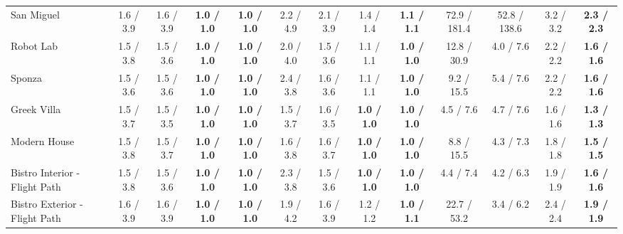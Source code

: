 \begin{table*}[t]
\begin{tabular}{l cccc|cccc|cccc}
	San Miguel                    & 1.6 / 3.9            & 1.6 / 3.9            & \textbf{1.0 / 1.0}          & \textbf{1.0 / 1.0}          & 2.2 / 4.9            & 2.1 / 3.9            & 1.4 / 1.4            & \textbf{1.1 / 1.1}          & 72.9 / 181.4          & 52.8 / 138.6         & 3.2 / 3.2            & \textbf{2.3 / 2.3}          \\
	Robot Lab                     & 1.5 / 3.8            & 1.5 / 3.6            & \textbf{1.0 / 1.0}          & \textbf{1.0 / 1.0}          & 2.0 / 4.0            & 1.5 / 3.6            & 1.1 / 1.1            & \textbf{1.0 / 1.0}          & 12.8 / 30.9           & 4.0 / 7.6            & 2.2 / 2.2            & \textbf{1.6 / 1.6}          \\
	Sponza                        & 1.5 / 3.6            & 1.5 / 3.6            & \textbf{1.0 / 1.0}          & \textbf{1.0 / 1.0}          & 2.4 / 3.8            & 1.6 / 3.6            & 1.1 / 1.1            & \textbf{1.0 / 1.0}          & 9.2 / 15.5            & 5.4 / 7.6            & 2.2 / 2.2            & \textbf{1.6 / 1.6}          \\
	Greek Villa                   & 1.5 / 3.7            & 1.5 / 3.5            & \textbf{1.0 / 1.0}          & \textbf{1.0 / 1.0}          & 1.5 / 3.7            & 1.6 / 3.5            & \textbf{1.0 / 1.0}   & \textbf{1.0 / 1.0}          & 4.5 / 7.6             & 4.7 / 7.6            & 1.6 / 1.6            & \textbf{1.3 / 1.3}          \\
	Modern House                  & 1.5 / 3.8            & 1.5 / 3.7            & \textbf{1.0 / 1.0}          & \textbf{1.0 / 1.0}          & 1.6 / 3.8            & 1.6 / 3.7            & \textbf{1.0 / 1.0}   & \textbf{1.0 / 1.0}          & 8.8 / 15.5            & 4.3 / 7.3            & 1.8 / 1.8            & \textbf{1.5 / 1.5}          \\
	Bistro Interior - Flight Path & 1.5 / 3.8            & 1.5 / 3.6            & \textbf{1.0 / 1.0}          & \textbf{1.0 / 1.0}          & 2.3 / 3.8            & 1.5 / 3.6            & \textbf{1.0 / 1.0}   & \textbf{1.0 / 1.0}          & 4.4 / 7.4             & 4.2 / 6.3            & 1.9 / 1.9            & \textbf{1.6 / 1.6}          \\
	Bistro Exterior - Flight Path & 1.6 / 3.9            & 1.6 / 3.9            & \textbf{1.0 / 1.0}          & \textbf{1.0 / 1.0}          & 1.9 / 4.2            & 1.6 / 3.9            & 1.2 / 1.2            & \textbf{1.0 / 1.1}          & 22.7 / 53.2           & 3.4 / 6.2            & 2.4 / 2.4            & \textbf{1.9 / 1.9}          \\

\end{tabular}
\end{table*}
